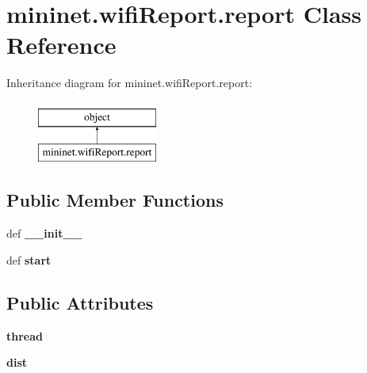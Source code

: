 \hypertarget{classmininet_1_1wifiReport_1_1report}{\section{mininet.\-wifi\-Report.\-report Class Reference}
\label{classmininet_1_1wifiReport_1_1report}
}
Inheritance diagram for mininet.\-wifi\-Report.\-report\-:\begin{figure}[H]
\begin{center}
\leavevmode
\includegraphics[height=2.000000cm]{classmininet_1_1wifiReport_1_1report}
\end{center}
\end{figure}
\subsection*{Public Member Functions}
\begin{DoxyCompactItemize}
\item 
\hypertarget{classmininet_1_1wifiReport_1_1report_ae922c90cd2693336092369c3b2c5a7e6}{def {\bfseries \-\_\-\-\_\-init\-\_\-\-\_\-}}\label{classmininet_1_1wifiReport_1_1report_ae922c90cd2693336092369c3b2c5a7e6}

\item 
\hypertarget{classmininet_1_1wifiReport_1_1report_a182090f7b1e9a332d4fcd1c7d049bd70}{def {\bfseries start}}\label{classmininet_1_1wifiReport_1_1report_a182090f7b1e9a332d4fcd1c7d049bd70}

\end{DoxyCompactItemize}
\subsection*{Public Attributes}
\begin{DoxyCompactItemize}
\item 
\hypertarget{classmininet_1_1wifiReport_1_1report_a4236a1187ed3b7d5ba3a8c485edda259}{{\bfseries thread}}\label{classmininet_1_1wifiReport_1_1report_a4236a1187ed3b7d5ba3a8c485edda259}

\item 
\hypertarget{classmininet_1_1wifiReport_1_1report_a7db6127b8070248931777d9d18ecd6a6}{{\bfseries dist}}\label{classmininet_1_1wifiReport_1_1report_a7db6127b8070248931777d9d18ecd6a6}

\end{DoxyCompactItemize}
